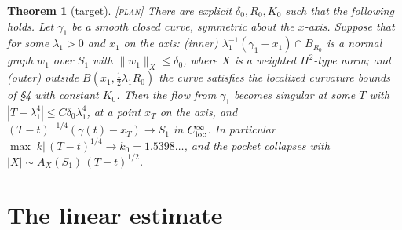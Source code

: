 \documentclass[11pt]{amsart}
\newtheorem{theorem}{Theorem}
\theoremstyle{remark}
\newcommand{\lab}[1]{\textup{\textsc{[#1]}}}
\begin{document}
\begin{theorem}[target]\label{thm:target}\lab{plan}
There are explicit $\delta_0,R_0,K_0$ such that the following holds. Let $\gamma_1$ be a smooth closed curve, symmetric about the $x$-axis. Suppose that for some $\lambda_1>0$ and $x_1$ on the axis: \emph{(inner)} $\lambda_1^{-1}(\gamma_1-x_1)\cap B_{R_0}$ is a normal graph $w_1$ over $S_1$ with $\|w_1\|_{X}\le\delta_0$, where $X$ is a weighted $H^2$-type norm; and \emph{(outer)} outside $B(x_1,\frac12\lambda_1R_0)$ the curve satisfies the localized curvature bounds of \S4 with constant $K_0$. Then the flow from $\gamma_1$ becomes singular at some $T$ with $|T-\lambda_1^4|\le C\delta_0\lambda_1^4$, at a point $x_T$ on the axis, and $(T-t)^{-1/4}(\gamma(t)-x_T)\to S_1$ in $C^\infty_{\rm loc}$. In particular $\max|k|\,(T-t)^{1/4}\to k_0=1.5398\ldots$, and the pocket collapses with $|X|\sim A_X(S_1)\,(T-t)^{1/2}$.
\end{theorem}

\section{The linear estimate}\label{sec:linear}
\end{document}
